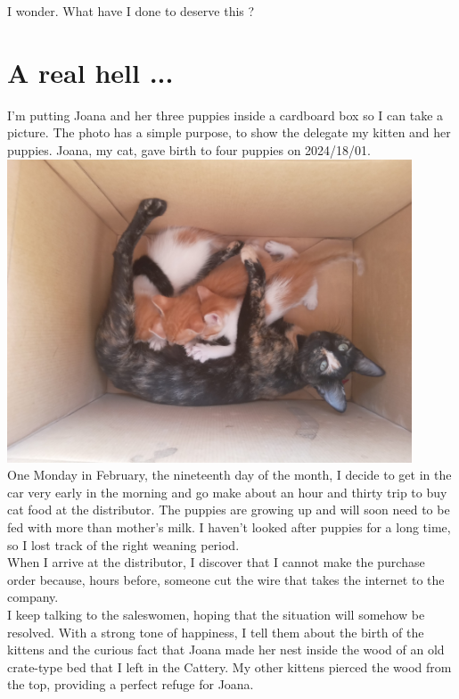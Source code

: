 \documentclass[11pt]{book}
\begin{document}
\noindent I wonder. What have I done to deserve this ?

\chapter{A real hell ...}

\noindent I'm putting Joana and her three puppies inside a cardboard box so I can take a picture. The photo has a simple purpose, to show the delegate my kitten and her puppies. Joana, my cat, gave birth to four puppies on 2024/18/01. \\

\includegraphics[width=0.9\textwidth]{figures/puppies.jpg} \\

\noindent One Monday in February, the nineteenth day of the month, I decide to get in the car very early in the morning and go make about an hour and thirty trip to buy cat food at the distributor. The puppies are growing up and will soon need to be fed with more than mother's milk. I haven't looked after puppies for a long time, so I lost track of the right weaning period. \\

\noindent When I arrive at the distributor, I discover that I cannot make the purchase order because, hours before, someone cut the wire that takes the internet to the company. \\

\noindent I keep talking to the saleswomen, hoping that the situation will somehow be resolved. With a strong tone of happiness, I tell them about the birth of the kittens and the curious fact that Joana made her nest inside the wood of an old crate-type bed that I left in the Cattery. My other kittens pierced the wood from the top, providing a perfect refuge for Joana. \\
\end{document}
